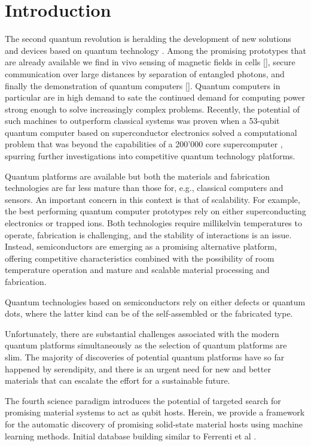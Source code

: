 \documentclass[superscriptaddress,unsortedaddress,
 amsmath,amssymb,
 aps,
]{revtex4-2}
\begin{document}
\section*{Introduction}%
The second quantum revolution is heralding the development of new solutions and devices based on quantum technology \cite{Acin2018}. Among the promising prototypes that are already available we find in vivo sensing of magnetic fields in cells [], secure communication over large distances by separation of entangled photons, and finally the demonstration of quantum computers []. 
Quantum computers in particular are in high demand to sate the continued demand for computing power strong enough to solve increasingly complex problems. 
Recently, the potential of such machines to outperform classical systems was proven when a 53-qubit quantum computer based on superconductor electronics solved a computational problem that was beyond the capabilities of a 200'000 core supercomputer \cite{Arute_2019}, spurring further investigations into competitive quantum technology platforms.  

Quantum platforms are available but both the materials and fabrication technologies are far less mature than those for, e.g., classical computers and sensors. 
An important concern in this context is that of scalability. 
For example, the best performing quantum computer prototypes rely on either superconducting electronics or trapped ions. Both technologies require millikelvin temperatures to operate, fabrication is challenging, and the stability of interactions is an issue. 
Instead, semiconductors are emerging as a promising alternative platform, offering competitive characteristics combined with the possibility of room temperature operation and mature and scalable material processing and fabrication.  

Quantum technologies based on semiconductors rely on either defects or quantum dots, where the latter kind can be of the self-assembled or the fabricated type. 

Unfortunately, there are substantial challenges associated with the modern quantum platforms simultaneously as the selection of quantum platforms are slim. The majority of discoveries of potential quantum platforms have so far happened by serendipity, and there is an urgent need for new and better materials that can escalate the effort for a sustainable future. 

The fourth science paradigm introduces the potential of targeted search for promising material systems to act as qubit hosts. 
Herein, we provide a framework for the automatic discovery of promising solid-state material hosts using machine learning methods. 
Initial database building similar to Ferrenti et al \cite{Ferrenti2020}. 
\end{document}
